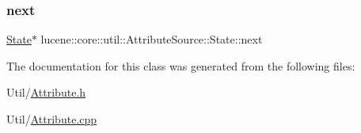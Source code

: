 \mbox{\label{classlucene_1_1core_1_1util_1_1AttributeSource_1_1State_af3f4b6f537c2da0ad12260b6ac698da2}} 
\subsubsection{\texorpdfstring{next}{next}}
{\footnotesize\ttfamily \mbox{\hyperlink{classlucene_1_1core_1_1util_1_1AttributeSource_1_1State}{State}}$\ast$ lucene\+::core\+::util\+::\+Attribute\+Source\+::\+State\+::next}



The documentation for this class was generated from the following files\+:\begin{DoxyCompactItemize}
\item 
Util/\mbox{\hyperlink{Util_2Attribute_8h}{Attribute.\+h}}\item 
Util/\mbox{\hyperlink{Util_2Attribute_8cpp}{Attribute.\+cpp}}\end{DoxyCompactItemize}
